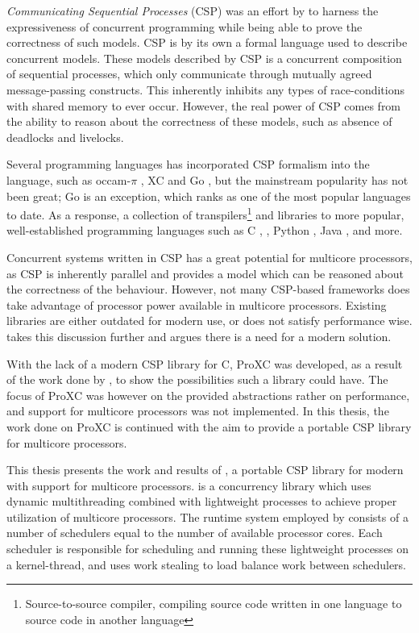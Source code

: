 \textit{Communicating Sequential Processes} (CSP) was an effort by \citet{hoare1978communicating} to harness the expressiveness of concurrent programming while being able to prove the correctness of such models. CSP is by its own a formal language used to describe concurrent models. These models described by CSP is a concurrent composition of sequential processes, which only communicate through mutually agreed message\hyp{}passing constructs. This inherently inhibits any types of race\hyp{}conditions with shared memory to ever occur. However, the real power of CSP comes from the ability to reason about the correctness of these models, such as absence of deadlocks and livelocks.  

Several programming languages has incorporated CSP formalism into the language, such as occam-$\pi$ \citep{barrett1992occam}, XC \citep{douglas2009programming} and Go \citep{go2009go}, but the mainstream popularity has not been great; Go is an exception, which ranks as one of the most popular languages to date. As a response, a collection of transpilers\footnote{Source\hyp{}to\hyp{}source compiler, compiling source code written in one language to source code in another language} and libraries to more popular, well\hyp{}established programming languages such as C \citep{pettersen2016proxc}, \Cpp{} \citep{brown2003c++csp,brown2007c++csp2,chalmers2016cppcsp}, Python \citep{bjorndalen2007pycsp}, Java \citep{welch2007jcsp}, and more. 

Concurrent systems written in CSP has a great potential for multicore processors, as CSP is inherently parallel and provides a model which can be reasoned about the correctness of the behaviour. However, not many CSP\hyp{}based frameworks does take advantage of processor power available in multicore processors. Existing libraries are either outdated for modern use, or does not satisfy performance wise.  takes this discussion further and argues there is a need for a modern solution.

With the lack of a modern CSP library for C, ProXC was developed, as a result of the work done by \citet{pettersen2016proxc}, to show the possibilities such a library could have. The focus of ProXC was however on the provided abstractions rather on performance, and support for multicore processors was not implemented. In this thesis, the work done on ProXC is continued with the aim to provide a portable CSP library for multicore processors. 

This thesis presents the work and results of \Proxc{}, a portable CSP library for modern \Cpp{} with support for multicore processors. \Proxc{} is a concurrency library which uses dynamic multithreading combined with lightweight processes to achieve proper utilization of multicore processors. The runtime system employed by \Proxc{} consists of a number of schedulers equal to the number of available processor cores. Each scheduler is responsible for scheduling and running these lightweight processes on a kernel\hyp{}thread, and uses work stealing to load balance work between schedulers. 


